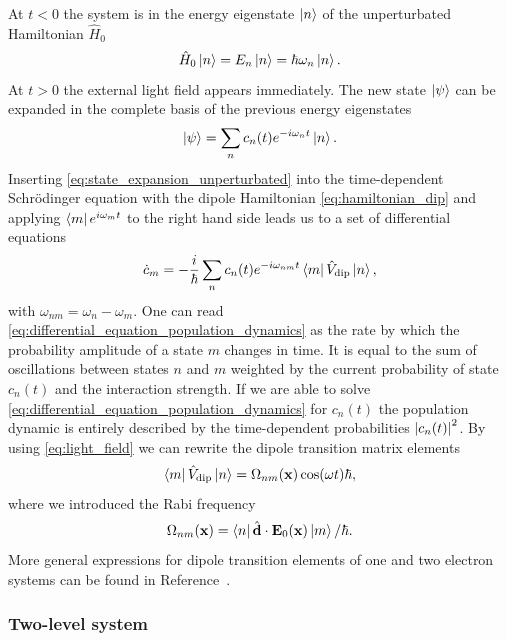 At $t<0$ the system is in the energy eigenstate $\ket{n}$ of the
unperturbated Hamiltonian $\hat{H}_0$
\begin{equation}
  \hat{H}_0\ket{n}
  =E_n\ket{n}
  =\hbar\omega_n\ket{n}
  \label{eq:eigenvalue_energy_unperturbated}.
\end{equation}
At $t>0$ the external light field appears immediately. The new state
$\ket{\psi}$ can be expanded in the complete basis of the previous energy
eigenstates
\begin{equation}
  \ket{\psi}
  =
  \sum_n{c_n(t)}{e^{-i{\omega_n}t}}\ket{n}
  \label{eq:state_expansion_unperturbated}.
\end{equation}
Inserting \cref{eq:state_expansion_unperturbated} into the time-dependent
Schrödinger equation with the dipole Hamiltonian \cref{eq:hamiltonian_dip} and
applying $\bra{m}{e^{i{\omega_m}t}}$ to the right hand side leads us to a set
of differential equations
\begin{equation}
  \dot{c}_m
  =
  -\frac{i}{\hbar}\sum_n{c_n(t)}{e^{-i\omega_{nm}t}}
  \bra{m}\hat{V}_\text{dip}\ket{n}
  \label{eq:differential_equation_population_dynamics},
\end{equation}
with $\omega_{nm}=\omega_n-\omega_m$. One can read
\cref{eq:differential_equation_population_dynamics} as the rate by which
the probability amplitude of a state $m$ changes in time. It is equal to the
sum of oscillations between states $n$ and $m$ weighted by the current
probability of state $c_n(t)$ and the interaction strength. If we are able to
solve \cref{eq:differential_equation_population_dynamics} for $c_n(t)$ the
population dynamic is entirely described by the time-dependent probabilities
$\abs{c_n(t)}^2$. By using \cref{eq:light_field} we can rewrite the dipole
transition matrix elements
\begin{equation}
  \bra{m}\hat{V}_\text{dip}\ket{n}
  =\Omega_{nm}(\vb{x})\cos(\omega t)\hbar
  \label{eq:elements_dipole_transition_matrix},
\end{equation}
where we introduced the Rabi frequency
\begin{equation}
  \Omega_{nm}(\vb{x})
  =\bra{n}\hat{\vb{d}}\cdot\vb{E}_0(\vb{x})\ket{m}/\hbar
  \label{eq:rabi_frequency}.
\end{equation}
More general expressions for dipole transition elements of one and two
electron systems can be found in Reference~\cite{Bethe1957}. 

\subsubsection{Two-level system}

